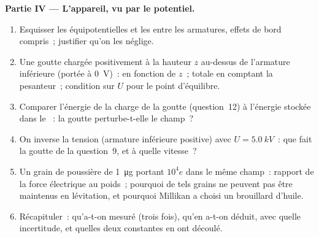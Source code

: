 \begin{problem}
\medskip
\noindent\textbf{Partie IV --- L'appareil, vu par le potentiel.}
\begin{enumerate}[resume]
  \item Esquisser les équipotentielles et les  entre les
        armatures, effets de bord compris~; justifier qu'on les néglige.
  \item Une goutte chargée positivement à la hauteur $z$ au-dessus de
        l'armature inférieure (portée à \qty{0}{V})~:  en
        fonction de $z$~;  totale en comptant la
        pesanteur~; condition sur $U$ pour le point d'équilibre.
  \item Comparer l'énergie de la charge de la goutte (question~12) à
        l'énergie stockée dans le ~: la goutte perturbe-t-elle le
        champ~?
  \item On inverse la tension (armature inférieure positive) avec
        $U = \qty{5.0}{kV}$~: que fait la goutte de la question~9, et à quelle
        vitesse~?
  \item Un grain de poussière de \qty{1}{\micro g} portant $10^4e$ dans le
        même champ~: rapport de la force électrique au poids~; pourquoi de
        tels grains ne peuvent pas être maintenus en lévitation, et pourquoi
        Millikan a choisi un brouillard d'huile.
  \item Récapituler~: qu'a-t-on mesuré (trois fois), qu'en a-t-on déduit, avec
        quelle incertitude, et quelles deux constantes en ont découlé.
\end{enumerate}
\end{problem}
